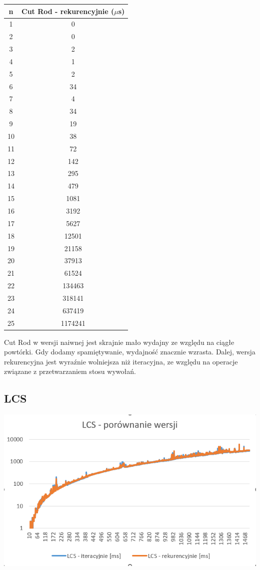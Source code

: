 \documentclass{article}
\begin{document}
\begin{center}
\begin{tabular}{c|c}
    \hline
    n & Cut Rod - rekurencyjnie ($\mu$s) \\
    \hline
    1 & 0 \\
    2 & 0 \\
    3 & 2 \\
    4 & 1 \\
    5 & 2 \\
    6 & 34 \\
    7 & 4 \\
    8 & 34 \\
    9 & 19 \\
    10 & 38 \\
    11 & 72 \\
    12 & 142 \\
    13 & 295 \\
    14 & 479 \\
    15 & 1081 \\
    16 & 3192 \\
    17 & 5627 \\
    18 & 12501 \\
    19 & 21158 \\
    20 & 37913 \\
    21 & 61524 \\
    22 & 134463 \\
    23 & 318141 \\
    24 & 637419 \\
    25 & 1174241 \\
    \hline
\end{tabular}
\end{center}

Cut Rod w wersji naiwnej jest skrajnie mało wydajny ze względu na ciągłe powtórki. Gdy dodamy spamiętywanie, wydajność znacznie wzrasta. Dalej, wersja rekurencyjna jest wyraźnie wolniejsza niż iteracyjna, ze względu na operacje związane z przetwarzaniem stosu wywołań.

\subsection{LCS}

\begin{center}
    \includegraphics[width=1\textwidth]{LCS.png}
\end{center}
\end{document}
